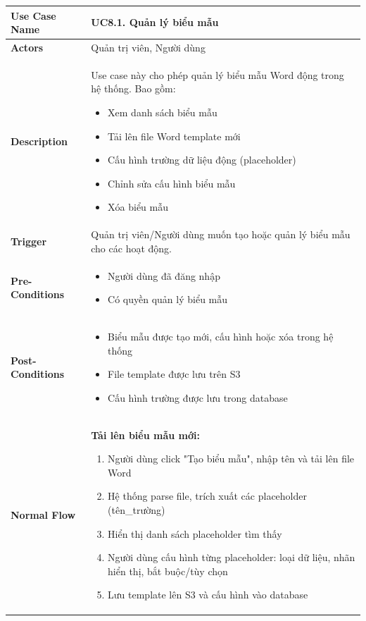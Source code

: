     \newpage
    \begin{table}[H]
    \renewcommand{\arraystretch}{1.3}
    \begin{tabular}{|m{}|m{}|}
    \hline
    \textbf{Use Case Name} 
    & \textbf{UC8.1. Quản lý biểu mẫu} \\ \hline

\textbf{Actors} 
& Quản trị viên, Người dùng \\ \hline

\textbf{Description}
    & Use case này cho phép quản lý biểu mẫu Word động trong hệ thống. Bao gồm:
    \begin{itemize}
        \item Xem danh sách biểu mẫu
        \item Tải lên file Word template mới
        \item Cấu hình trường dữ liệu động (placeholder)
        \item Chỉnh sửa cấu hình biểu mẫu
        \item Xóa biểu mẫu
    \end{itemize}
    \\ \hline

    \textbf{Trigger} 
    & Quản trị viên/Người dùng muốn tạo hoặc quản lý biểu mẫu cho các hoạt động.
    \\ \hline

    \textbf{Pre-Conditions} 
    & \begin{itemize}
        \item Người dùng đã đăng nhập
        \item Có quyền quản lý biểu mẫu
    \end{itemize}
    \\ \hline

    \textbf{Post-Conditions} 
    & \begin{itemize}
        \item Biểu mẫu được tạo mới, cấu hình hoặc xóa trong hệ thống
        \item File template được lưu trên S3
        \item Cấu hình trường được lưu trong database
    \end{itemize}
    \\ \hline

    \textbf{Normal Flow} 
    & \textbf{Tải lên biểu mẫu mới:}
    \begin{enumerate}
        \item Người dùng click "Tạo biểu mẫu", nhập tên và tải lên file Word
        \item Hệ thống parse file, trích xuất các placeholder ({{tên\_trường}})
        \item Hiển thị danh sách placeholder tìm thấy
        \item Người dùng cấu hình từng placeholder: loại dữ liệu, nhãn hiển thị, bắt buộc/tùy chọn
        \item Lưu template lên S3 và cấu hình vào database
    \end{enumerate}


\end{tabular}
\end{table}
